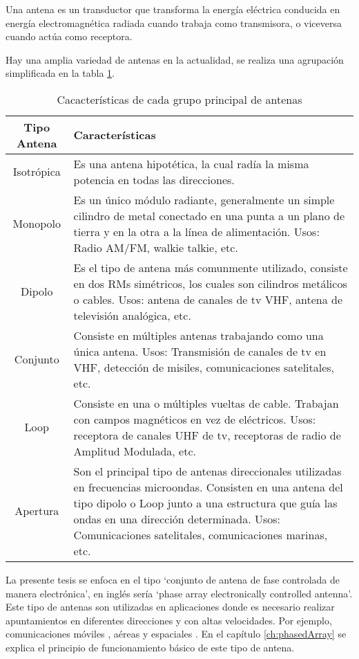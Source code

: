 Una antena es un transductor que transforma la energía eléctrica conducida en energía electromagnética radiada cuando 
trabaja como transmisora, o viceversa cuando actúa como receptora.

Hay una amplia variedad de antenas en la actualidad, se realiza una agrupación simplificada en la tabla \ref{tab:type_antennas}.

\begin{table}[H]
  \footnotesize
  \centering
  \begin{tabular}{|c|p{9cm}|}
	\hline
	\textbf{Tipo Antena} & \textbf{Características} \\\hline
	Isotrópica & Es una antena hipotética, la cual radía la misma potencia en todas las direcciones.\\\hline
	Monopolo & Es un único módulo radiante, generalmente un simple cilindro de metal conectado en una punta a un plano de 
	tierra y en la otra a la línea de alimentación. Usos: Radio AM/FM, walkie talkie, etc. \\\hline
	Dipolo & Es el tipo de antena más comunmente utilizado, consiste en dos RMs simétricos, los cuales son cilindros 
	metálicos o cables. Usos: antena de canales de tv VHF, antena de televisión analógica, etc. \\\hline
	Conjunto & Consiste en múltiples antenas trabajando como una única antena. Usos: Transmisión de canales de tv en VHF, 
	detección de misiles, comunicaciones satelitales, etc.\\\hline
	Loop & Consiste en una o múltiples vueltas de cable. Trabajan con campos magnéticos en vez de eléctricos. Usos: receptora 
	de canales UHF de tv, receptoras de radio de Amplitud Modulada, etc.\\\hline
	Apertura & Son el principal tipo de antenas direccionales utilizadas en frecuencias microondas. Consisten en una antena 
	del tipo dipolo o Loop junto a una estructura que guía las ondas en una dirección determinada. Usos: Comunicaciones 
	satelitales, comunicaciones marinas, etc.\\\hline
  \end{tabular}
  \caption{Cacacterísticas de cada grupo principal de antenas}
  \label{tab:type_antennas}
\end{table}

La presente tesis se enfoca en el tipo \enquote*{conjunto de antena de fase controlada de manera electrónica}, en inglés 
sería \enquote*{phase array electronically controlled antenna}. Este tipo de antenas son utilizadas en aplicaciones donde 
es necesario realizar apuntamientos en diferentes direcciones y con altas velocidades. Por ejemplo, comunicaciones móviles 
\cite{Chen2012}, aéreas \cite{MHong1989} y espaciales \cite{Shimada1995}\cite{Makhoul2012}. En el capítulo 
\ref{ch:phasedArray} se explica el principio de funcionamiento básico de este tipo de antena. 

